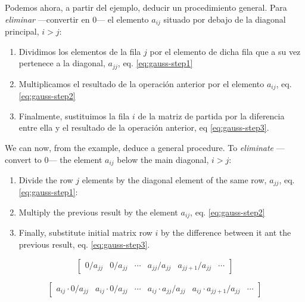 \begin{paracol}{2}


Podemos ahora, a partir del ejemplo, deducir un procedimiento general. Para \emph{eliminar} ---convertir en 0--- el elemento $a_{ij}$ situado por debajo de la diagonal principal,  $i>j$:
\begin{enumerate}
\item Dividimos los elementos de la fila $j$ por el elemento de dicha fila que a su vez pertenece a la diagonal, $a_{jj}$, eq. \ref{eq:gauss-step1}
\item Multiplicamos el resultado de la operación anterior por el elemento $a_{ij}$, eq. \ref{eq:gauss-step2}
\item Finalmente, sustituimos la fila $i$ de la matriz de partida por la diferencia  entre ella y el resultado de la operación anterior, eq \ref{eq:gauss-step3}.
\end{enumerate}

\switchcolumn
We can now, from the example, deduce a general procedure. To \emph{eliminate} ---convert to 0--- the element $a_{ij}$ below the main diagonal, $i>j$:
\begin{enumerate}
    \item Divide the row $j$ elements by the diagonal element of the same row, $a_{jj}$, eq. \ref{eq:gauss-step1}:
    \item Multiply the previous result by the element $a_{ij}$, eq. \ref{eq:gauss-step2}
    \item Finally, substitute initial matrix row $i$ by the difference between it ant the previous result, eq. \ref{eq:gauss-step3}.
\end{enumerate}
\end{paracol}

\begin{equation}\label{eq:gauss-step1}
    \begin{bmatrix}
    0/ a_{jj}& 0/ a_{jj}& \cdots & a_{jj}/ a_{jj}& a_{jj+1}/ a_{jj}& \cdots
    \end{bmatrix}
\end{equation}

\begin{equation}\label{eq:gauss-step2}
    \begin{bmatrix}
    a_{ij} \cdot 0/ a_{jj}& a_{ij} \cdot 0/ a_{jj}& \cdots & a_{ij} \cdot a_{jj}/ a_{jj}& a_{ij} \cdot a_{jj+1}/ a_{jj}& \cdots
    \end{bmatrix}
\end{equation}

